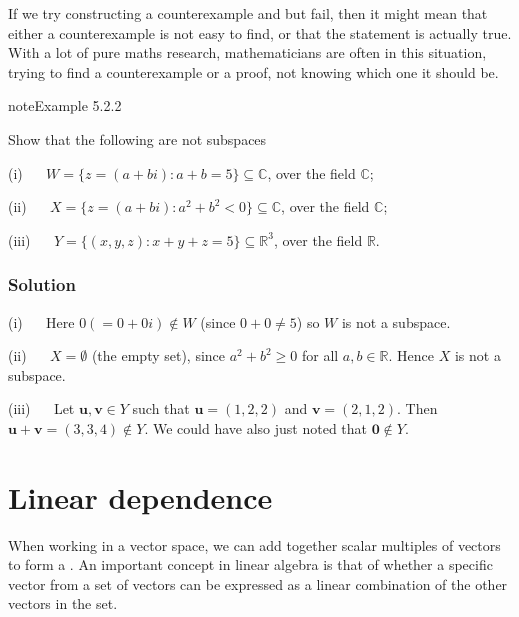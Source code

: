 \documentclass[letterpaper,10pt,english]{jupyterBook}
\begin{document}
\sphinxAtStartPar
If we try constructing a counterexample and but fail, then it might mean that either a counterexample is not easy to find, or that the statement is actually true. With a lot of pure maths research, mathematicians are often in this situation, trying to find a counterexample or a proof, not knowing which one it should be.


\label{_pages/5.2_Subspaces:non-subspace-example}
\begin{sphinxadmonition}{note}{Example 5.2.2}



\sphinxAtStartPar
Show that the following are not subspaces

\sphinxAtStartPar
(i)   \(W = \{z = (a+bi) : a + b = 5\} \subseteq \mathbb{C}\), over the field \(\mathbb{C}\);

\sphinxAtStartPar
(ii)   \(X = \{z = (a + bi) : a^2 + b^2 < 0\} \subseteq \mathbb{C}\), over the field \(\mathbb{C}\);

\sphinxAtStartPar
(iii)   \(Y = \{(x,y,z) : x + y + z = 5\} \subseteq{\mathbb{R}^3}\), over the field \(\mathbb{R}\).
\subsubsection*{Solution}

\sphinxAtStartPar
(i)   Here \(0 (= 0+0i) \notin W\) (since \(0+0 \neq 5\)) so \(W\) is not a subspace.

\sphinxAtStartPar
(ii)   \(X = \emptyset\) (the empty set), since \(a^2 + b^2 \geq 0\) for all \(a, b \in \mathbb{R}\). Hence \(X\) is not a subspace.

\sphinxAtStartPar
(iii)   Let \(\mathbf{u}, \mathbf{v} \in Y\) such that \(\mathbf{u} = (1, 2, 2)\) and \(\mathbf{v} = (2, 1, 2)\). Then \(\mathbf{u} + \mathbf{v} = (3, 3, 4) \notin Y\). We could have also just noted that \(\mathbf{0} \notin Y\).
\end{sphinxadmonition}

\sphinxstepscope

\ignorespaces 

\section{Linear dependence}
\label{\detokenize{_pages/5.3_Linear_dependence:linear-dependence}}\label{\detokenize{_pages/5.3_Linear_dependence:index-0}}\label{\detokenize{_pages/5.3_Linear_dependence:linear-dependence-section}}\label{\detokenize{_pages/5.3_Linear_dependence::doc}}
\sphinxAtStartPar
When working in a vector space, we can add together scalar multiples of vectors to form a . An important concept in linear algebra is that of whether a specific vector from a set of vectors can be expressed as a linear combination of the other vectors in the set.
\end{document}
